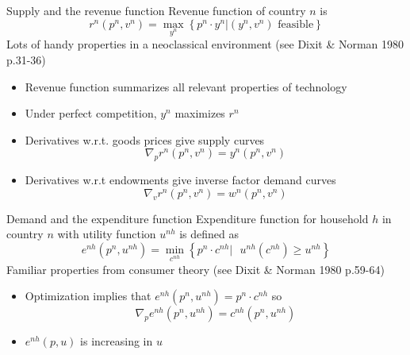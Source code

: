\documentclass[11pt,notes=hide,aspectratio=169]{beamer}
\begin{document}
\begin{frame}{Supply and the revenue function}
Revenue function of country $n$ is
\begin{equation*}
r^{n}\left( p^{n},v^{n}\right) =
\max_{y^{n}}\left\{ p^{n} \cdot y^{n}|\left(y^{n},v^{n}\right) \text{ feasible}\right\}
\end{equation*}
Lots of handy properties in a neoclassical environment (see Dixit \& Norman 1980 p.31-36)
\begin{itemize}
	\item Revenue function summarizes all relevant properties of technology
	\item Under perfect competition, $y^n$ maximizes $r^n$
	\item Derivatives w.r.t. goods prices give supply curves
	\begin{equation*}
	\nabla_p r^{n}\left( p^{n},v^{n}\right) = y^{n}\left( p^{n},v^{n}\right)
	\end{equation*}
	\item Derivatives w.r.t endowments give inverse factor demand curves
	\begin{equation*}
	\nabla_v r^{n}\left( p^{n},v^{n}\right) = w^{n}\left( p^{n},v^{n}\right)
	\end{equation*}
\end{itemize}
\end{frame}
\begin{frame}{Demand and the expenditure function}
Expenditure function for household $h$ in country $n$ with utility function $u^{nh}$ is defined as
\begin{equation*}
e^{nh}\left( p^{n},u^{nh}\right) =
\min_{c^{nh}}\left\{ p^{n} \cdot c^{nh}|\text{ }
u^{nh}\left( c^{nh}\right) \geq u^{nh}\right\}
\end{equation*}
Familiar properties from consumer theory (see Dixit \& Norman 1980 p.59-64)
\begin{itemize}
	\item Optimization implies that $e^{nh}\left( p^{n},u^{nh}\right) = p^{n}\cdot c^{nh}$ so
	\begin{equation*}
	\nabla_p e^{nh}\left(p^{n},u^{nh}\right) = c^{nh}\left(p^{n},u^{nh}\right)
	\end{equation*}
	\item $e^{nh}\left( p,u\right)$ is increasing in $u$
\end{itemize}
\end{frame}
\end{document}
